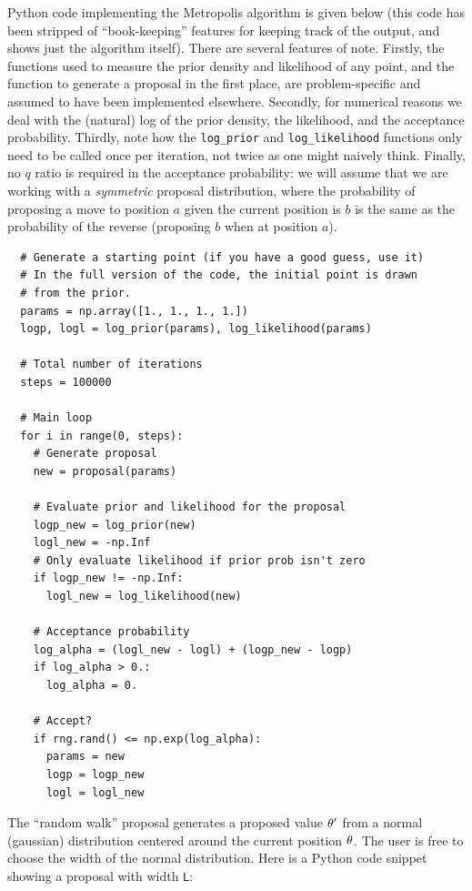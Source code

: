 Python code implementing the Metropolis algorithm is given below (this code
has been stripped of ``book-keeping'' features for keeping track of the output,
and shows just the algorithm itself). There are
several features of note. Firstly, the functions used to measure the prior
density and likelihood of any point, and the function to generate a proposal
in the first place, are problem-specific and assumed to have
been implemented elsewhere. Secondly, for numerical reasons we deal with the
(natural) log of the prior density, the likelihood, and the acceptance
probability. Thirdly, note how the {\tt log\_prior} and {\tt log\_likelihood}
functions only need to be called once per iteration, not twice as one might
naively think. Finally, no $q$ ratio is required in the acceptance probability:
we will assume that we are working with a {\it symmetric} proposal distribution,
where the probability of proposing a move to position $a$ given the current
position is $b$ is the same as the probability of the reverse (proposing
$b$ when at position $a$).

\begin{verbatim}
  # Generate a starting point (if you have a good guess, use it)
  # In the full version of the code, the initial point is drawn
  # from the prior.
  params = np.array([1., 1., 1., 1.])
  logp, logl = log_prior(params), log_likelihood(params)

  # Total number of iterations
  steps = 100000

  # Main loop
  for i in range(0, steps):
    # Generate proposal
    new = proposal(params)

    # Evaluate prior and likelihood for the proposal
    logp_new = log_prior(new)
    logl_new = -np.Inf
    # Only evaluate likelihood if prior prob isn't zero
    if logp_new != -np.Inf:
      logl_new = log_likelihood(new)

    # Acceptance probability
    log_alpha = (logl_new - logl) + (logp_new - logp)
    if log_alpha > 0.:
      log_alpha = 0.

    # Accept?
    if rng.rand() <= np.exp(log_alpha):
      params = new
      logp = logp_new
      logl = logl_new
\end{verbatim}

The ``random walk'' proposal generates a proposed value $\theta'$ from a normal
(gaussian) distribution centered around the current position $\theta$. The user
is free to choose the width of the normal distribution. Here is a Python code
snippet showing a proposal with width {\tt L}:


